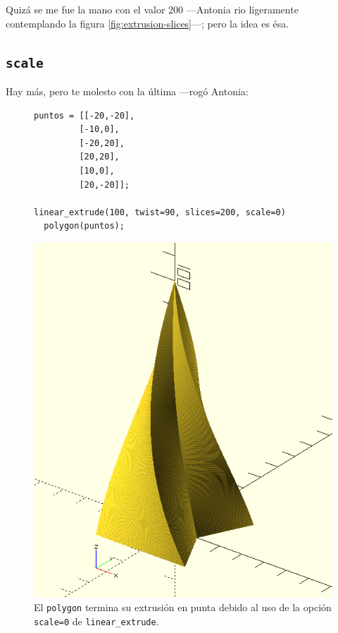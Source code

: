   \guillemotright Quizá se me fue la mano con el valor 200 ---Antonia
  rio ligeramente contemplando la figura
  \ref{fig:extrusion-slices}---; pero la idea es ésa.

\subsection{\texttt{scale}}

\guillemotright Hay más, pero te molesto con la última ---rogó Antonia:

  \begin{figure}[ht]
  \begin{minipage}[]{.6\textwidth}%
    \begin{lstlisting}
puntos = [[-20,-20],
         [-10,0],
         [-20,20],
         [20,20],
         [10,0],
         [20,-20]];

linear_extrude(100, twist=90, slices=200, scale=0)
  polygon(puntos);
    \end{lstlisting}
  \end{minipage}\hfill
  \begin{minipage}[]{.4\textwidth}%
      \centering
    \includegraphics[width=\textwidth]{imagenes/extrusion-scale-0}
    \end{minipage}
    \caption{El \lstinline!polygon! termina su extrusión en punta
      debido al uso de la opción \texttt{scale=0} de
      \lstinline!linear_extrude!.}
  \label{fig:extrusion-scale-0}
  \end{figure}



